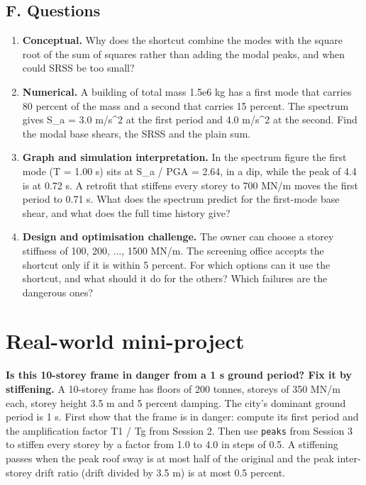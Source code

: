 \documentclass[11pt,a4paper]{article}
\begin{document}
\subsection*{F. Questions}
\begin{enumerate}[nosep]
\item \textbf{Conceptual.} Why does the shortcut combine the modes with the square root of the sum of squares rather than adding the modal peaks, and when could SRSS be too small?
\item \textbf{Numerical.} A building of total mass 1.5e6 kg has a first mode that carries 80 percent of the mass and a second that carries 15 percent. The spectrum gives S\_a = 3.0 m/s\textasciicircum{}2 at the first period and 4.0 m/s\textasciicircum{}2 at the second. Find the modal base shears, the SRSS and the plain sum.
\item \textbf{Graph and simulation interpretation.} In the spectrum figure the first mode (T = 1.00 s) sits at S\_a / PGA = 2.64, in a dip, while the peak of 4.4 is at 0.72 s. A retrofit that stiffens every storey to 700 MN/m moves the first period to 0.71 s. What does the spectrum predict for the first-mode base shear, and what does the full time history give?
\item \textbf{Design and optimisation challenge.} The owner can choose a storey stiffness of 100, 200, ..., 1500 MN/m. The screening office accepts the shortcut only if it is within 5 percent. For which options can it use the shortcut, and what should it do for the others? Which failures are the dangerous ones?
\end{enumerate}

\section{Real-world mini-project}
\textbf{Is this 10-storey frame in danger from a 1 s ground period? Fix it by stiffening.} A 10-storey frame has floors of 200 tonnes, storeys of 350 MN/m each, storey height 3.5 m and 5 percent damping. The city's dominant ground period is 1 s. First show that the frame is in danger: compute its first period and the amplification factor T1 / Tg from Session 2. Then use \texttt{peaks} from Session 3 to stiffen every storey by a factor from 1.0 to 4.0 in steps of 0.5. A stiffening passes when the peak roof sway is at most half of the original and the peak inter-storey drift ratio (drift divided by 3.5 m) is at most 0.5 percent.
\end{document}
